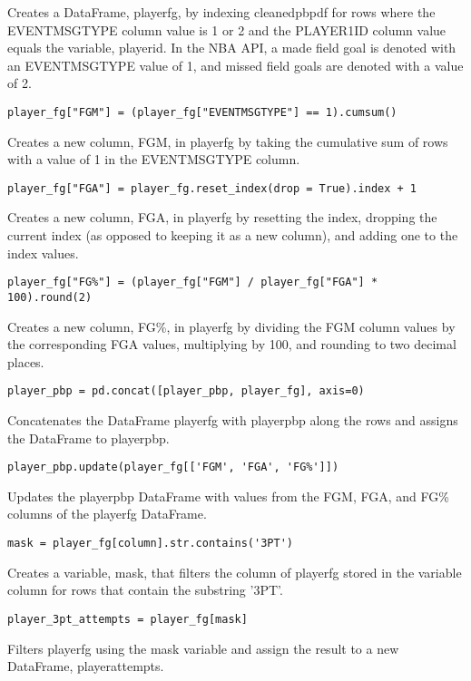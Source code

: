 \documentclass{article}
\begin{document}
Creates a DataFrame, player\textunderscore fg, by indexing cleaned\textunderscore pbp\textunderscore df for rows where the EVENTMSGTYPE column value is 1 or 2 and the PLAYER1\textunderscore ID column value equals the variable, player\textunderscore id. In the NBA API, a made field goal is denoted with an EVENTMSGTYPE value of 1, and missed field goals are denoted with a value of 2.
\begin{lstlisting}
player_fg["FGM"] = (player_fg["EVENTMSGTYPE"] == 1).cumsum()
\end{lstlisting}
Creates a new column, FGM, in player\textunderscore fg by taking the cumulative sum of rows with a value of 1 in the EVENTMSGTYPE column.
\begin{lstlisting}
player_fg["FGA"] = player_fg.reset_index(drop = True).index + 1
\end{lstlisting}
Creates a new column, FGA, in player\textunderscore fg by resetting the index, dropping the current index (as opposed to keeping it as a new column), and adding one to the index values.
\begin{lstlisting}
player_fg["FG%"] = (player_fg["FGM"] / player_fg["FGA"] * 100).round(2)
\end{lstlisting}
Creates a new column, FG\%, in player\textunderscore fg by dividing the FGM column values by the corresponding FGA values, multiplying by 100, and rounding to two decimal places.
\begin{lstlisting}
player_pbp = pd.concat([player_pbp, player_fg], axis=0)
\end{lstlisting}
Concatenates the DataFrame player\textunderscore fg with player\textunderscore pbp along the rows and assigns the DataFrame to player\textunderscore pbp.
\begin{lstlisting}
player_pbp.update(player_fg[['FGM', 'FGA', 'FG%']])
\end{lstlisting}
Updates the player\textunderscore pbp DataFrame with values from the FGM, FGA, and FG\% columns of the player\textunderscore fg DataFrame.
\begin{lstlisting}
mask = player_fg[column].str.contains('3PT')
\end{lstlisting}
Creates a variable, mask, that filters the column of player\textunderscore fg stored in the variable column for rows that contain the substring '3PT'.
\begin{lstlisting}
player_3pt_attempts = player_fg[mask]
\end{lstlisting}
Filters player\textunderscore fg using the mask variable and assign the result to a new DataFrame, player\textunderscore 3pt\textunderscore attempts.
\end{document}

